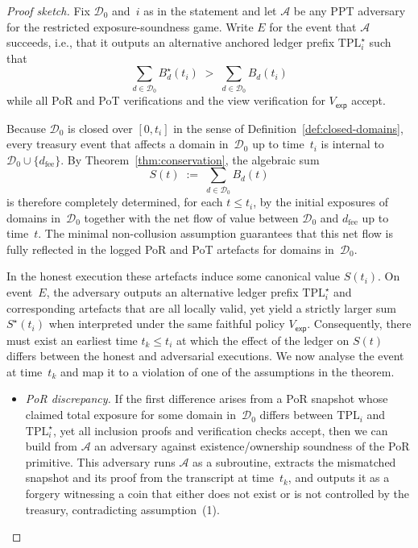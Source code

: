 \documentclass[11pt]{article}
\begin{document}
\begin{proof}[Proof sketch]
Fix $\mathcal{D}_0$ and~$i$ as in the statement and let $\mathcal{A}$ be any
PPT adversary for the restricted exposure-soundness game.
Write $E$ for the event that $\mathcal{A}$ succeeds, i.e., that it outputs an
alternative anchored ledger prefix $\mathrm{TPL}^\star_i$ such that
\[
  \sum_{d \in \mathcal{D}_0} B^\star_d(t_i)
  \;>\;
  \sum_{d \in \mathcal{D}_0} B_d(t_i)
\]
while all PoR and PoT verifications and the view verification for
$V_{\mathsf{exp}}$ accept.

Because $\mathcal{D}_0$ is closed over $[0,t_i]$ in the sense of
Definition~\ref{def:closed-domains}, every treasury event that affects a
domain in~$\mathcal{D}_0$ up to time~$t_i$ is internal to
$\mathcal{D}_0 \cup \{d_{\mathrm{fee}}\}$.
By Theorem~\ref{thm:conservation}, the algebraic sum
\[
  S(t) \;:=\; \sum_{d \in \mathcal{D}_0} B_d(t)
\]
is therefore completely determined, for each $t \le t_i$, by the initial
exposures of domains in~$\mathcal{D}_0$ together with the net flow of value
between $\mathcal{D}_0$ and $d_{\mathrm{fee}}$ up to time~$t$.
The minimal non-collusion assumption guarantees that this net flow is fully
reflected in the logged PoR and PoT artefacts for domains in~$\mathcal{D}_0$.

In the honest execution these artefacts induce some canonical value
$S(t_i)$.
On event~$E$, the adversary outputs an alternative ledger prefix
$\mathrm{TPL}^\star_i$ and corresponding artefacts that are all locally
valid, yet yield a strictly larger sum $S^\star(t_i)$ when interpreted under
the same faithful policy $V_{\mathsf{exp}}$.
Consequently, there must exist an earliest time $t_k \le t_i$ at which the
effect of the ledger on $S(t)$ differs between the honest and adversarial
executions.
We now analyse the event at time~$t_k$ and map it to a violation of one of the
assumptions in the theorem.

\begin{itemize}[noitemsep]
  \item \emph{PoR discrepancy.}
        If the first difference arises from a PoR snapshot whose claimed total
        exposure for some domain in~$\mathcal{D}_0$ differs between
        $\mathrm{TPL}_i$ and $\mathrm{TPL}^\star_i$, yet all inclusion proofs
        and verification checks accept, then we can build from $\mathcal{A}$
        an adversary against existence/ownership soundness of the PoR
        primitive.
        This adversary runs $\mathcal{A}$ as a subroutine, extracts the
        mismatched snapshot and its proof from the transcript at time~$t_k$,
        and outputs it as a forgery witnessing a coin that either does not
        exist or is not controlled by the treasury, contradicting assumption~(1).


\end{itemize}
\end{proof}
\end{document}
